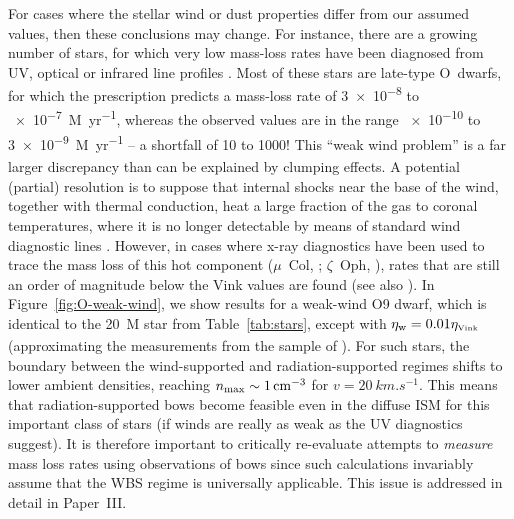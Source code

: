 For cases where the stellar wind or dust properties differ from our
assumed values, then these conclusions may change.  For instance,
there are a growing number of stars, for which very low mass-loss
rates have been diagnosed from UV, optical or infrared line profiles
\citep{Martins:2005b, Marcolino:2009a, Najarro:2011a, Martins:2012a,
  Shenar:2017a, Smith:2017b}.  Most of these stars are late-type
O~dwarfs, for which the \citet{Vink:2000a} prescription predicts a
mass-loss rate of \num{3e-8} to \SI{e-7}{M_\odot.yr^{-1}}, whereas the
observed values are in the range \num{e-10} to \SI{3e-9}{M_\odot.yr^{-1}}
-- a shortfall of 10 to 1000!  This ``weak wind problem'' is a far
larger discrepancy than can be explained by clumping effects.  A
potential (partial) resolution is to suppose that internal shocks near
the base of the wind, together with thermal conduction, heat a large
fraction of the gas to coronal temperatures, where it is no longer
detectable by means of standard wind diagnostic lines
\citep{Lucy:2012a}.  However, in cases where x-ray diagnostics have
been used to trace the mass loss of this hot component (\(\mu\)~Col,
\citealp{Huenemoerder:2012a}; \(\zeta\)~Oph, \citealp{Cohen:2014a}), rates
that are still an order of magnitude below the Vink values are found
(see also \citealp{Shenar:2017a}).  In Figure~\ref{fig:O-weak-wind},
we show results for a weak-wind O9 dwarf, which is identical to the
\SI{20}{M_\odot} star from Table~\ref{tab:stars}, except with
\(\eta_{\text{w}} = 0.01 \eta_{\text{\tiny Vink}}\) (approximating the measurements from the
sample of \citealp{Martins:2005b}).  For such stars, the boundary
between the wind-supported and radiation-supported regimes shifts to
lower ambient densities, reaching \(n_{\text{max}} \sim \SI{1}{cm^{-3}}\) for
\(v = \SI{20}{km.s^{-1}}\).  This means that radiation-supported bows
become feasible even in the diffuse ISM for this important class of
stars (if winds are really as weak as the UV diagnostics suggest).  It
is therefore important to critically re-evaluate attempts to
\emph{measure} mass loss rates using observations of bows
\citep{Gvaramadze:2012a, Kobulnicky:2018a} since such calculations
invariably assume that the WBS regime is universally applicable.  This
issue is addressed in detail in Paper~III.

